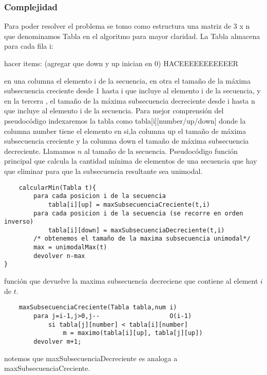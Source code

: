 \subsubsection{Complejidad}
Para poder resolver el problema se tomo como estructura una matriz de 3 x n que denominamos Tabla en el algoritmo para mayor claridad.
\newline
La Tabla almacena para cada fila i: 

hacer items: (agregar que down y up inician en 0)
HACEEEEEEEEEEER

en una columna el elemento  i de la secuencia, en otra el tamaño de la máxima subsecuencia creciente desde 1 hasta i que incluye al elemento i de la secuencia, y en la tercera , el tamaño de la máxima subsecuencia decreciente desde  i hasta n que incluye al elemento i de la secuencia.
\newline
Para mejor comprensión del pseudocódigo indexaremos la tabla como tabla[i][number/up/down] donde la columna number  tiene el elemento en si,la columna up el tamaño de máxima subsecuencia creciente y la columna down el tamaño de máxima subsecuencia decreciente. Llamamos $n$ al tamaño de la secuencia.
\newline
Pseudocódigo
\newline
función principal que calcula la cantidad mínima de elementos de una secuencia que hay que eliminar para que la subsecuencia resultante sea unimodal.
\begin{verbatim}
    calcularMin(Tabla t){
        para cada posicion i de la secuencia
            tabla[i][up] = maxSubsecuenciaCreciente(t,i)
        para cada posicion i de la secuencia (se recorre en orden inverso)
            tabla[i][down] = maxSubsecuenciaDecreciente(t,i)
        /* obtenemos el tamaño de la maxima subsecuencia unimodal*/   
        max = unimodalMax(t)     
        devolver n-max
}
\end{verbatim}

función que devuelve la maxima subsecuencia decreciene que contiene al element $i$ de $t$.

\begin{verbatim}                   
    maxSubsecuenciaCreciente(Tabla tabla,num i)    
        para j=i-1,j>0,j--                   O(i-1)
            si tabla[j][number] < tabla[i][number]
                m = maximo(tabla[i][up], tabla[j][up]) 	
        devolver m+1;
\end{verbatim}
notemos que maxSubsecuenciaDecreciente es analoga a maxSubsecuenciaCreciente.


